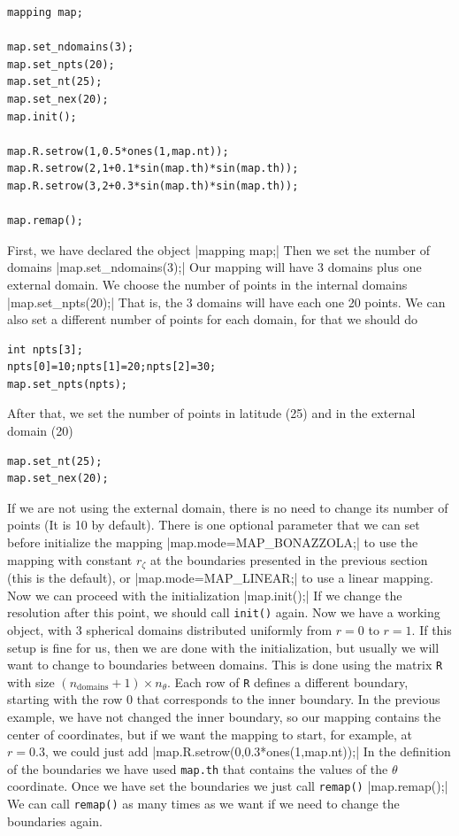 \begin{verbatim}
mapping map;

map.set_ndomains(3);
map.set_npts(20);
map.set_nt(25);
map.set_nex(20);
map.init();

map.R.setrow(1,0.5*ones(1,map.nt));
map.R.setrow(2,1+0.1*sin(map.th)*sin(map.th));
map.R.setrow(3,2+0.3*sin(map.th)*sin(map.th));

map.remap();

\end{verbatim} 
First, we have declared the object
|mapping map;|
Then we set the number of domains
|map.set_ndomains(3);|
Our mapping will have 3 domains plus one external domain. We choose the number of points in the internal
domains
|map.set_npts(20);|
That is, the 3 domains will have each one 20 points. We can also set a different number of points for
each domain, for that we should do
\begin{verbatim}
int npts[3];
npts[0]=10;npts[1]=20;npts[2]=30;
map.set_npts(npts);
\end{verbatim}
After that, we set the number of points in latitude (25) and in the external domain (20)
\begin{verbatim}
map.set_nt(25);
map.set_nex(20);
\end{verbatim}
If we are not using the external domain, there is no need to change its number of points (It is 10 by default).
There is one optional parameter that we can set before initialize the mapping
|map.mode=MAP_BONAZZOLA;|
to use the mapping with constant $r_\zeta$ at the boundaries presented in the previous section (this is
the default), or
|map.mode=MAP_LINEAR;|
to use a linear mapping. Now we can proceed with the initialization
|map.init();|
If we change the resolution after this point, we should call \verb|init()| again. Now
we have a working object, with 3 spherical domains distributed uniformly from $r=0$ to $r=1$.
If this setup is fine for us,
then we are done with the initialization, but usually we will want to change to boundaries between
domains. This is done using the matrix \verb|R| with size $(n_\mathrm{domains}+1)\times n_\theta$.
Each row of \verb|R| defines a different boundary, starting with the row 0 that corresponds to the inner boundary.
In the previous example, we have not changed the inner boundary, so our mapping contains the center of 
coordinates, but if we want the mapping to start, for example, at $r=0.3$, we could just add
|map.R.setrow(0,0.3*ones(1,map.nt));|
In the definition of the boundaries we have used \verb|map.th| that contains the values of the $\theta$ coordinate.
Once we have set the boundaries we just call \verb|remap()|
|map.remap();|
We can call \verb|remap()| as many times as we want if we need to change the boundaries again.

